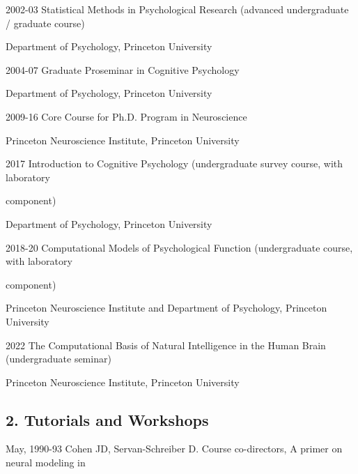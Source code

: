 \documentclass[10 pt]{article}
\begin{document}
2002-03 \hspace{0.3in} Statistical Methods in Psychological Research (advanced undergraduate / graduate course)

\hspace{0.81in} Department of Psychology, Princeton University
    \smallskip

2004-07 \hspace{0.3in} Graduate Proseminar in Cognitive Psychology

\hspace{0.81in} Department of Psychology, Princeton University
    \smallskip

2009-16 \hspace{0.3in} Core Course for Ph.D. Program in Neuroscience

\hspace{0.81in} Princeton Neuroscience Institute, Princeton University
    \smallskip

2017 \hspace{0.48in} Introduction to Cognitive Psychology (undergraduate survey course, with laboratory

\hspace{0.81in} component)

\hspace{0.81in} Department of Psychology, Princeton University
    \smallskip

2018-20 \hspace{0.3in} Computational Models of Psychological Function (undergraduate course, with laboratory

\hspace{0.81in} component)

\hspace{0.81in} Princeton Neuroscience Institute and Department of Psychology, Princeton University
    \smallskip

2022 \hspace{0.51in} The Computational Basis of Natural Intelligence in the Human Brain (undergraduate seminar)

\hspace{0.81in} Princeton Neuroscience Institute, Princeton University
    \smallskip

\subsection*{2. Tutorials and Workshops} \label{secTEACHING2}
    \medskip

May, 1990-93 \hspace{0.25in} Cohen JD, Servan-Schreiber D. Course co-directors, A primer on neural modeling in
\end{document}

